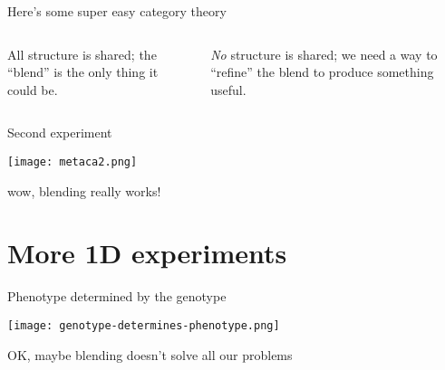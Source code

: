 \begin{frame}[fragile]{Here's some super easy category theory}{}
\begin{columns}[]
\begin{column}[T]{5.5cm}
\vspace*{.2cm}

{\centering All structure is shared; the ``blend'' is the only thing it could be.\par}
\end{column}
\begin{column}[T]{5.5cm}
\vspace*{.2cm}

{\centering \emph{No} structure is shared; we need a way to ``refine'' the blend to produce something useful.\par}
\end{column}
\end{columns}
\end{frame}

\begin{frame}{Second experiment}{}
\begin{center}
\texttt{[image: metaca2.png]}
\pause

wow, blending really works!
\end{center}
\end{frame}

\part{More 1D experiments}
\frame{\partpage}

\begin{frame}{Phenotype determined by the genotype}{}
\begin{center}
\texttt{[image: genotype-determines-phenotype.png]}
\pause

OK, maybe blending doesn't solve all our problems
\end{center}
\end{frame}

